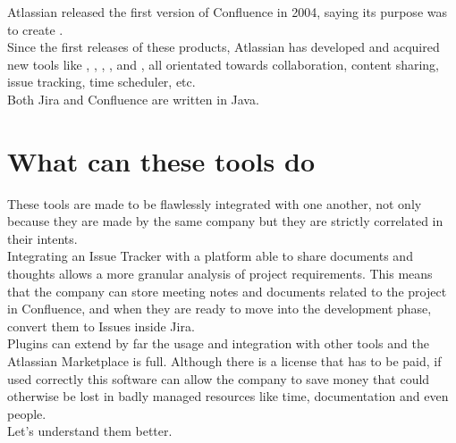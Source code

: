 	Atlassian released the first version of Confluence in 2004, saying its purpose was to create \cite{theserverside}.\\
	Since the first releases of these products, Atlassian has developed and acquired new tools like , , , , and , all orientated towards collaboration, content sharing, issue tracking, time scheduler, etc.\\
	Both Jira and Confluence are written in Java.

\section{What can these tools do}
	These tools are made to be flawlessly integrated with one another, not only because they are made by the same company but they are strictly correlated in their intents.\\
	Integrating an Issue Tracker with a platform able to share documents and thoughts allows a more granular analysis of project requirements.
	This means that the company can store meeting notes and documents related to the project in Confluence, and when they are ready to move into the development phase, convert them to Issues inside Jira.\\
	Plugins can extend by far the usage and integration with other tools and the Atlassian Marketplace\cite{marketplace.atlassian} is full.
	Although there is a license that has to be paid, if used correctly this software can allow the company to save money that could otherwise be lost in badly managed resources like time, documentation and even people.\\
	Let's understand them better.
